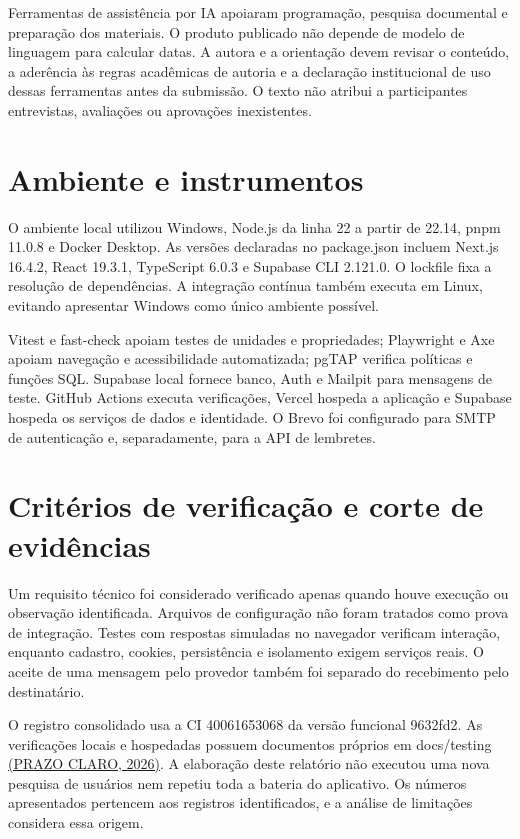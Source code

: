 Ferramentas de assistência por IA apoiaram programação, pesquisa documental e preparação dos materiais. O produto publicado não depende de modelo de linguagem para calcular datas. A autora e a orientação devem revisar o conteúdo, a aderência às regras acadêmicas de autoria e a declaração institucional de uso dessas ferramentas antes da submissão. O texto não atribui a participantes entrevistas, avaliações ou aprovações inexistentes.

\section{Ambiente e instrumentos}
\label{section-3-3}
O ambiente local utilizou Windows, Node.js da linha 22 a partir de 22.14, pnpm 11.0.8 e Docker Desktop. As versões declaradas no package.json incluem Next.js 16.4.2, React 19.3.1, TypeScript 6.0.3 e Supabase CLI 2.121.0. O lockfile fixa a resolução de dependências. A integração contínua também executa em Linux, evitando apresentar Windows como único ambiente possível.

Vitest e fast-check apoiam testes de unidades e propriedades; Playwright e Axe apoiam navegação e acessibilidade automatizada; pgTAP verifica políticas e funções SQL. Supabase local fornece banco, Auth e Mailpit para mensagens de teste. GitHub Actions executa verificações, Vercel hospeda a aplicação e Supabase hospeda os serviços de dados e identidade. O Brevo foi configurado para SMTP de autenticação e, separadamente, para a API de lembretes.

\section{Critérios de verificação e corte de evidências}
\label{section-3-4}
Um requisito técnico foi considerado verificado apenas quando houve execução ou observação identificada. Arquivos de configuração não foram tratados como prova de integração. Testes com respostas simuladas no navegador verificam interação, enquanto cadastro, cookies, persistência e isolamento exigem serviços reais. O aceite de uma mensagem pelo provedor também foi separado do recebimento pelo destinatário.

O registro consolidado usa a CI 40061653068 da versão funcional 9632fd2. As verificações locais e hospedadas possuem documentos próprios em docs/testing \hyperref[ref:PROJETO]{(PRAZO CLARO, 2026)}. A elaboração deste relatório não executou uma nova pesquisa de usuários nem repetiu toda a bateria do aplicativo. Os números apresentados pertencem aos registros identificados, e a análise de limitações considera essa origem.
